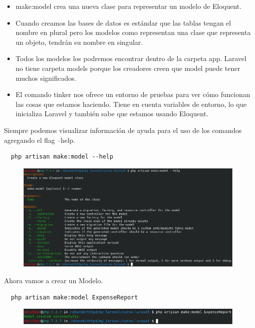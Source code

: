 \documentclass{article}
\begin{document}
\begin{itemize}
  \item make:model crea una nueva clase para representar un modelo de Eloquent.
  \item Cuando creamos las bases de datos es estándar que las tablas tengan el
    nombre en plural pero los modelos como representan una clase que representa
    un objeto, tendrán su nombre en singular.
  \item Todos los modelos los podremos encontrar dentro de la carpeta app.
    Laravel no tiene carpeta models porque los creadores creen que model puede
    tener muchos significados.
  \item El comando tinker nos ofrece un entorno de pruebas para ver cómo
    funcionan las cosas que estamos haciendo. Tiene en cuenta variables de
    entorno, lo que inicializa Laravel y también sabe que estamos usando
    Eloquent.
\end{itemize}

Siempre podemos visualizar información de ayuda para el uso de los comandos
agregando el flag --help.

\begin{verbatim}
  php artisan make:model --help
\end{verbatim}

\begin{figure}[h!]
  \centering
  \includegraphics[scale=0.65]{./Pictures/038_make_model_help.png}
\end{figure}

Ahora vamos a crear un Modelo.

\begin{verbatim}
  php artisan make:model ExpenseReport
\end{verbatim}

\begin{figure}[h!]
  \centering
  \includegraphics[scale=0.75]{./Pictures/039_model_created.png}
\end{figure}
\end{document}
